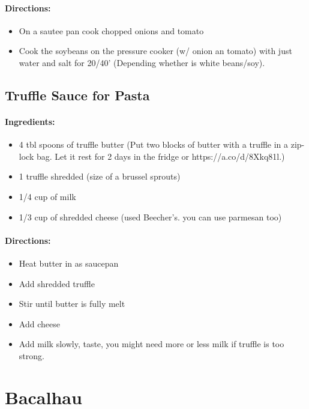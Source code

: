 \documentclass{article}
\begin{document}
\paragraph{Directions:}
\begin{itemize}
	\item On a sautee pan cook chopped onions and tomato
	\item Cook the soybeans on the pressure cooker (w/ onion an tomato) with just water and salt for 20/40' (Depending whether is white beans/soy).
\end{itemize}

\subsection{Truffle Sauce for Pasta}

\paragraph{Ingredients:}
\begin{itemize}
	\item 4 tbl spoons of truffle butter (Put two blocks of butter with a truffle in a zip-lock bag. Let it rest for 2 days in the fridge or https://a.co/d/8Xkq81l.)
	\item 1 truffle shredded (size of a brussel sprouts)
	\item 1/4 cup of milk
	\item 1/3 cup of shredded cheese (used Beecher's. you can use parmesan too)
\end{itemize}

\paragraph{Directions:}
\begin{itemize}
	\item Heat butter in as saucepan
	\item Add shredded truffle
	\item Stir until butter is fully melt
	\item Add cheese
	\item Add milk slowly, taste, you might need more or less milk if truffle is too strong.
\end{itemize}

\section{Bacalhau}
\end{document}
